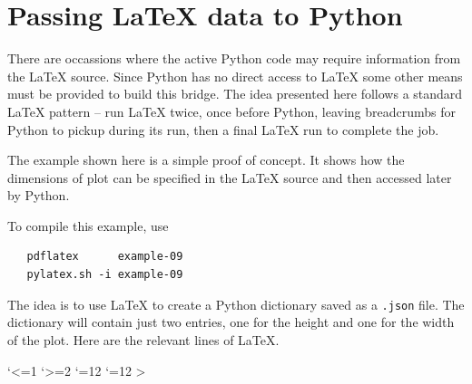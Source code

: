 \documentclass[12pt]{pylatex}
\makeatletter
\def\inches#1{\strip@pt\dimexpr #1*65536/\number\dimexpr1in}
\makeatother
\begin{document}
\section*{Passing LaTeX data to Python}

There are occassions where the active Python code may require information from the LaTeX source. Since Python has no direct access to LaTeX some other means must be provided to build this bridge. The idea presented here follows a standard LaTeX pattern -- run LaTeX twice, once before Python, leaving breadcrumbs for Python to pickup during its run, then a final LaTeX run to complete the job.

The example shown here is a simple proof of concept. It shows how the dimensions of plot can be specified in the LaTeX source and then accessed later by Python.

To compile this example, use

\begin{lstlisting}
   pdflatex      example-09
   pylatex.sh -i example-09
\end{lstlisting}

The idea is to use LaTeX to create a Python dictionary saved as a {\tt\small .json} file. The dictionary will contain just two entries, one for the height and one for the width of the plot. Here are the relevant lines of LaTeX.

\vspace{10pt}


\begingroup
\catcode`<=1 \catcode`>=2 \catcode`{=12 \catcode`}=12
\gdef\writebgroup<{> \gdef\writeegroup<}>
\endgroup
\end{document}
